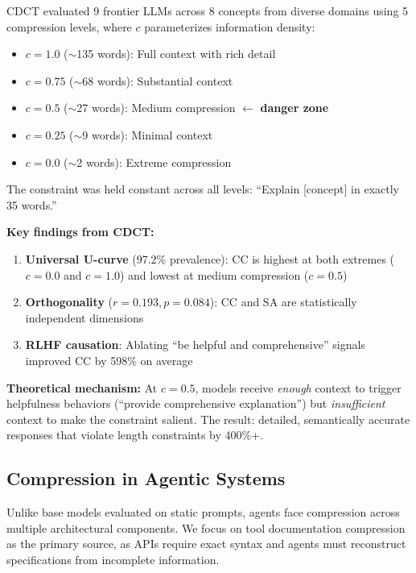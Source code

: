 \documentclass[11pt]{article}
\begin{document}
CDCT evaluated 9 frontier LLMs across 8 concepts from diverse domains using 5 compression levels, where $c$ parameterizes information density:

\begin{itemize}
\item $c=1.0$ ($\sim$135 words): Full context with rich detail
\item $c=0.75$ ($\sim$68 words): Substantial context
\item $c=0.5$ ($\sim$27 words): Medium compression $\leftarrow$ \textbf{danger zone}
\item $c=0.25$ ($\sim$9 words): Minimal context
\item $c=0.0$ ($\sim$2 words): Extreme compression
\end{itemize}

The constraint was held constant across all levels: ``Explain [concept] in exactly 35 words.''

\textbf{Key findings from CDCT:}

\begin{enumerate}
\item \textbf{Universal U-curve} (97.2\% prevalence): CC is highest at both extremes ($c=0.0$ and $c=1.0$) and lowest at medium compression ($c=0.5$)
\item \textbf{Orthogonality} ($r=0.193, p=0.084$): CC and SA are statistically independent dimensions
\item \textbf{RLHF causation}: Ablating ``be helpful and comprehensive'' signals improved CC by 598\% on average
\end{enumerate}

\textbf{Theoretical mechanism:} At $c=0.5$, models receive \emph{enough} context to trigger helpfulness behaviors (``provide comprehensive explanation'') but \emph{insufficient} context to make the constraint salient. The result: detailed, semantically accurate responses that violate length constraints by 400\%+.

\subsection{Compression in Agentic Systems}

Unlike base models evaluated on static prompts, agents face compression across multiple architectural components. We focus on tool documentation compression as the primary source, as APIs require exact syntax and agents must reconstruct specifications from incomplete information.
\end{document}
